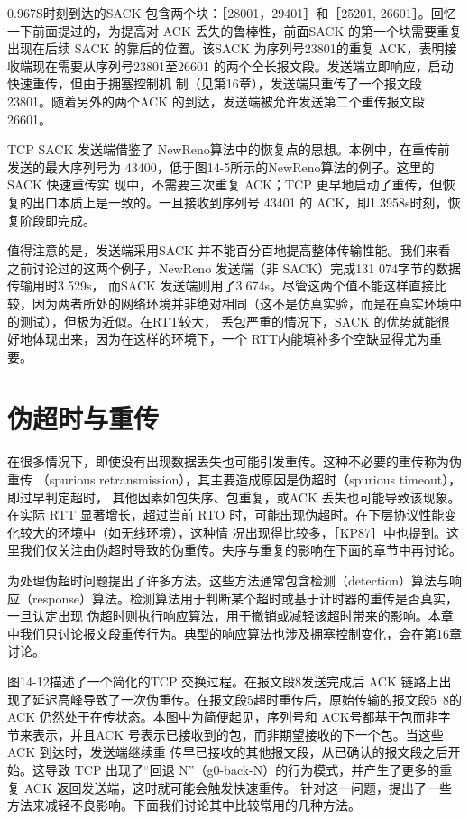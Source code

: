 0.967S时刻到达的SACK 包含两个块：［28001，29401］和［25201, 26601］。回忆一下前面提过的，为提高对 ACK
丢失的鲁棒性，前面SACK 的第一个块需要重复出现在后续
SACK 的靠后的位置。该SACK 为序列号23801的重复 ACK，表明接收端现在需要从序列号23801至26601
的两个全长报文段。发送端立即响应，启动快速重传，但由于拥塞控制机
制（见第16章），发送端只重传了一个报文段23801。随着另外的两个ACK 的到达，发送端被允许发送第二个重传报文段26601。

TCP SACK 发送端借鉴了 NewReno算法中的恢复点的思想。本例中，在重传前发送的最大序列号为
43400，低于图14-5所示的NewReno算法的例子。这里的SACK 快速重传实
现中，不需要三次重复 ACK；TCP 更早地启动了重传，但恢复的出口本质上是一致的。一且接收到序列号 43401 的
ACK，即1.3958s时刻，恢复阶段即完成。

值得注意的是，发送端采用SACK 并不能百分百地提高整体传输性能。我们来看之前讨论过的这两个例子，NewReno 发送端（非
SACK）完成131 074字节的数据传输用时3.529s，
而SACK
发送端则用了3.674s。尽管这两个值不能这样直接比较，因为两者所处的网络环境并非绝对相同（这不是仿真实验，而是在真实环境中的测试），但极为近似。在RTT较大，
丢包严重的情况下，SACK 的优势就能很好地体现出来，因为在这样的环境下，一个 RTT内能填补多个空缺显得尤为重要。

\section{伪超时与重传}
在很多情况下，即使没有出现数据丢失也可能引发重传。这种不必要的重传称为伪重传 （spurious
retransmission），其主要造成原因是伪超时（spurious timeout），即过早判定超时，
其他因素如包失序、包重复，或ACK 丢失也可能导致该现象。在实际 RTT 显著增长，超过当前 RTO
时，可能出现伪超时。在下层协议性能变化较大的环境中（如无线环境），这种情
况出现得比较多，［KP87］中也提到。这里我们仅关注由伪超时导致的伪重传。失序与重复的影响在下面的章节中再讨论。

为处理伪超时问题提出了许多方法。这些方法通常包含检测（detection）算法与响应（response）算法。检测算法用于判断某个超时或基于计时器的重传是否真实，一旦认定出现
伪超时则执行响应算法，用于撤销或减轻该超时带来的影响。本章中我们只讨论报文段重传行为。典型的响应算法也涉及拥塞控制变化，会在第16章讨论。

图14-12描述了一个简化的TCP 交换过程。在报文段8发送完成后 ACK
链路上出现了延迟高峰导致了一次伪重传。在报文段5超时重传后，原始传输的报文段5~8的ACK
仍然处于在传状态。本图中为简便起见，序列号和 ACK号都基于包而非字节来表示，并且ACK
号表示已接收到的包，而非期望接收的下一个包。当这些 ACK 到达时，发送端继续重
传早已接收的其他报文段，从已确认的报文段之后开始。这导致 TCP 出现了“回退 N”（g0-back-N）的行为模式，并产生了更多的重复
ACK 返回发送端，这时就可能会触发快速重传。
针对这一问题，提出了一些方法来减轻不良影响。下面我们讨论其中比较常用的几种方法。

